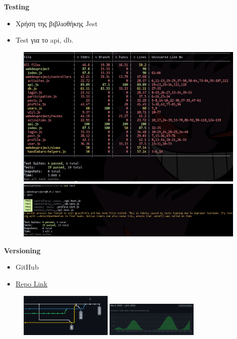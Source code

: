 \documentclass[xcolor=dvipsnames]{beamer}
\begin{document}
    \begin{frame}
        \begin{center}
        \textbf{Testing}
        \end{center}
        \begin{itemize}
            \item Χρήση της βιβλιοθήκης Jest
            \item Test για το api, db.
        \end{itemize}
        \begin{figure}[H]
            \includegraphics[width=0.4 \textwidth]{img/test1}
            \includegraphics[width=0.4 \textwidth]{img/test2}
        \end{figure}
    \end{frame}
    \begin{frame}
        \begin{center}
        \textbf{Versioning}
        \end{center}
        \begin{itemize}
            \item GitHub
            \item \href{https://github.com/vagos/webdevproject}{Repo Link}
        \end{itemize}
        \begin{figure}[H]
            \includegraphics[width=0.4\textwidth]{img/branches}
            \includegraphics[width=0.4\textwidth]{img/insights2}
        \end{figure}
    \end{frame}
\end{document}
